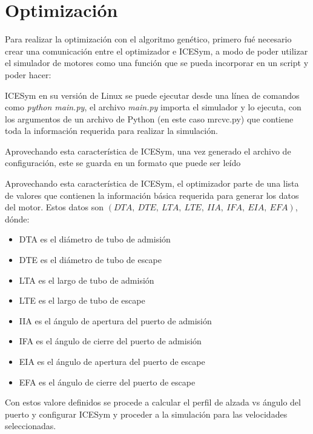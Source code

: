 \chapter{Optimización}

Para realizar la optimización con el algoritmo genético, primero fué necesario
crear una comunicación entre el optimizador e ICESym, a modo de poder utilizar
el simulador de motores como una función que se pueda incorporar en un script y poder hacer:


ICESym en su versión de Linux se puede ejecutar desde una línea de comandos como
\emph{python main.py}, el archivo \emph{main.py} importa el simulador y lo
ejecuta, con los argumentos de un archivo de Python (en este caso mrcvc.py) que
contiene toda la información requerida para realizar la simulación.

Aprovechando esta característica de ICESym, una vez generado el archivo de
configuración, este se guarda en un formato que puede ser leído

Aprovechando esta característica de ICESym, el optimizador parte de una lista de
valores que contienen la información básica requerida para generar los datos del
motor.
%
Estos datos son \emph{$(DTA,\ DTE,\ LTA,\ LTE,\ IIA,\ IFA,\ EIA,\ EFA)$}, dónde:
%
\begin{itemize}
    \item DTA es el diámetro de tubo de admisión
    \item DTE es el diámetro de tubo de escape
    \item LTA es el largo de tubo de admisión
    \item LTE es el largo de tubo de escape
    \item IIA es el ángulo de apertura del puerto de admisión
    \item IFA es el ángulo de cierre del puerto de admisión
    \item EIA es el ángulo de apertura del puerto de escape
    \item EFA es el ángulo de cierre del puerto de escape
\end{itemize}
%

Con estos valore definidos se procede a calcular el perfil de alzada vs ángulo
del puerto y configurar ICESym y proceder a la simulación para las velocidades seleccionadas.

